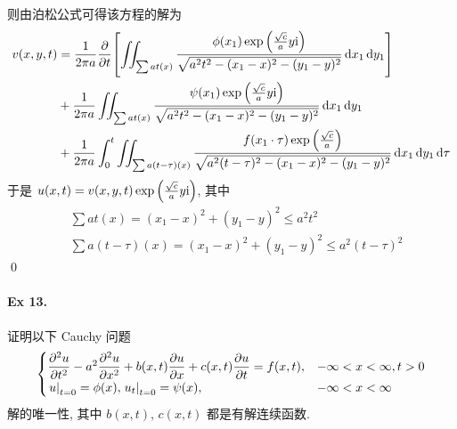 则由泊松公式可得该方程的解为
\[ \begin{aligned}
v(x, y, t) &= \frac1{2\pi a} {{\frac{\partial {}}{\partial {t}}}} {\left[ {
	\iint_{\sum a t(x)} \frac{
		\phi(x_1) \exp{\left( {\frac{\sqrt{c}}{a}y{\mathrm i}} \right)}
	}{
		\sqrt{a^2 t^2 - (x_1 -x)^2 - (y_1 - y)^2}
	} \operatorname{d\!} x_1 \operatorname{d\!} y_1
} \right]} \\
&+ \frac1{2\pi a} \iint_{\sum a t(x)} \frac{
	\psi(x_1) \exp{\left( {\frac{\sqrt{c}}{a}y{\mathrm i}} \right)}
}{
	\sqrt{a^2 t^2 - (x_1 -x)^2 - (y_1 - y)^2}
} \operatorname{d\!} x_1 \operatorname{d\!} y_1 \\
&+ \frac1{2\pi a} \int_0^t \iint_{\sum a (t - \tau)(x)} \frac{
	f(x_1 \cdot \tau) \exp{\left( {\frac{\sqrt{c}}{a}} \right)}
}{
	\sqrt{a^2 (t-\tau)^2 - (x_1 -x)^2 - (y_1 - y)^2}
} \operatorname{d\!} x_1 \operatorname{d\!} y_1 \operatorname{d\!} \tau \\
\end{aligned} \]
于是 $u(x, t) = v(x, y, t) \exp{\left( {\frac{\sqrt{c}}{a}y{\mathrm i}} \right)}$, 其中
\[ \begin{aligned}
&\sum a t(x) = (x_1 -x)^2 + (y_1 - y)^2 \leq a^2 t^2 \\
&\sum a (t - \tau)(x) = (x_1 -x)^2 + (y_1 - y)^2 \leq a^2 (t - \tau)^2
\end{aligned} \]
\qed

\paragraph{Ex 13.}
证明以下 Cauchy 问题
\[ \begin{cases}
\dfrac{\partial^2 u}{\partial t^2} - a^2 \dfrac{\partial^2 u}{\partial x^2}
 + b(x, t)\dfrac{\partial u}{\partial x} + c(x, t)\dfrac{\partial u}{\partial t}
 = f(x, t), & -\infty < x < \infty, t > 0 \\ 
{\left.{u} \right|}_{t=0} = \phi(x), {\left.{u_t} \right|}_{t=0} = \psi(x), & -\infty < x < \infty
\end{cases} \]
解的唯一性, 其中 $b(x, t)$, $c(x, t)$ 都是有解连续函数.

